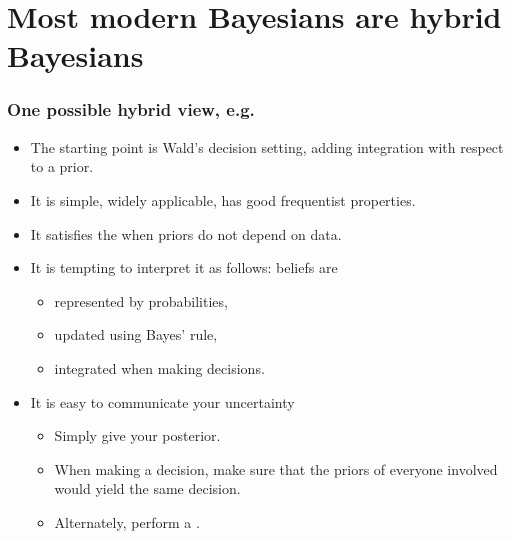 \documentclass[10pt]{beamer}
\begin{document}
\section{Most modern Bayesians are hybrid Bayesians}
\begin{frame}
  \frametitle{One possible hybrid view, e.g. \citep{Rob07}}
  \begin{itemize}
    \item The starting point is Wald's decision setting, adding integration with respect to a prior.
    \vfill
    \item It is simple, widely applicable, has good frequentist properties.
    \vfill
    \item It satisfies the  when priors do not depend on data.
    \vfill
    \item It is tempting to interpret it as follows: beliefs are
    \vfill
    \begin{itemize}
      \item represented by probabilities,
      \item updated using Bayes' rule,
      \item integrated when making decisions.
    \end{itemize}
    \vfill
    \item It is easy to communicate your uncertainty
    \vfill
    \begin{itemize}
      \item Simply give your posterior.
      \item When making a decision, make sure that the priors of everyone involved would yield the same decision.
      \item Alternately, perform a .
    \end{itemize}
  \end{itemize}
\end{frame}
\end{document}
